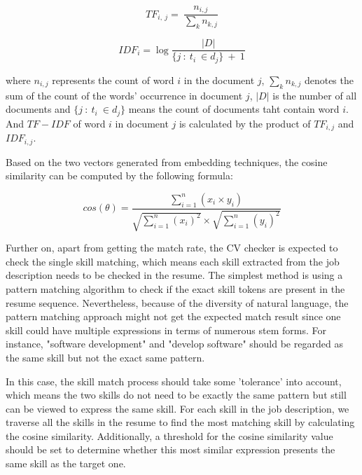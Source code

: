 \begin{equation}
    {TF_{i,\ j}=\ \frac{n_{i,j}}{\sum_{k}n_{k,j}}}
\end{equation}

\begin{equation}
    IDF_i=\log{\frac{|D|}{\{j\ :\ t_i\ \in d_j\}\ +\ 1}}
\end{equation}

where $n_{i,j}$ represents the count of word $i$ in the document $j$, $\sum_k n_{k,j}$ denotes the sum of the count of the words' occurrence in document $j$, $|D|$ is the number of all documents and $\{j\ :\ t_i\ \in d_j\}$ means the count of documents taht contain word $i$. And $TF - IDF$ of word $i$ in document $j$ is calculated by the product of $TF_{i,j}$ and $IDF_{i,j}$.

Based on the two vectors generated from embedding techniques, the cosine similarity can be computed by the following formula:


\begin{equation}
    cos(\theta) = \frac{\sum_{i=1}^{n}(x_i \times y_i)}{\sqrt{\sum_{i=1}^{n}(x_i)^2} \times \sqrt{\sum_{i=1}^{n}(y_i)^2}}
\end{equation}

Further on, apart from getting the match rate, the CV checker is expected to check the single skill matching, which means each skill extracted from the job description needs to be checked in the resume. The simplest method is using a pattern matching algorithm to check if the exact skill tokens are present in the resume sequence. Nevertheless, because of the diversity of natural language, the pattern matching approach might not get the expected match result since one skill could have multiple expressions in terms of numerous stem forms. For instance, "software development" and "develop software" should be regarded as the same skill but not the exact same pattern. 

In this case, the skill match process should take some 'tolerance' into account, which means the two skills do not need to be exactly the same pattern but still can be viewed to express the same skill. For each skill in the job description, we traverse all the skills in the resume to find the most matching skill by calculating the cosine similarity. Additionally, a threshold for the cosine similarity value should be set to determine whether this most similar expression presents the same skill as the target one.
